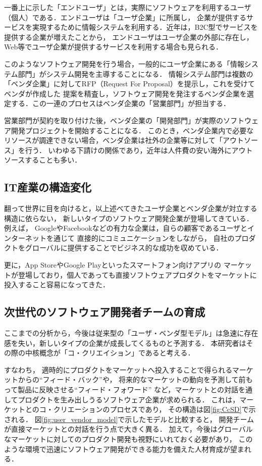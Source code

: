 \documentclass[a4j,9pt,twocolumn,twoside]{jsarticle}
\begin{document}
    一番上に示した「エンドユーザ」とは，実際にソフトウェアを利用するユーザ（個人）である．エンドユーザは「ユーザ企業」に所属し，
    企業が提供するサービスを実現するために情報システムを利用する．近年は，B2C型でサービスを提供する企業が増えたことから，
    エンドユーザはユーザ企業の外部に存在し，Web等でユーザ企業が提供するサービスを利用する場合も見られる．
    
    このようなソフトウェア開発を行う場合，一般的にユーザ企業にある「情報システム部門」がシステム開発を主導することになる．
    情報システム部門は複数の「ベンダ企業」に対してRFP（Request For Proposal）を提示し，これを受けてベンダが作成した
    提案を精査し，ソフトウェア開発を発注するベンダ企業を選定する．この一連のプロセスはベンダ企業の「営業部門」が担当する．
    
    営業部門が契約を取り付けた後，ベンダ企業の「開発部門」が実際のソフトウェア開発プロジェクトを開始することになる．
    このとき，ベンダ企業内で必要なリソースが調達できない場合，ベンダ企業は社外の企業等に対して「アウトソース」を行う．
    いわゆる下請けの関係であり，近年は人件費の安い海外にアウトソースすることも多い．
    
    \subsection{IT産業の構造変化}

    翻って世界に目を向けると，以上述べてきたユーザ企業とベンダ企業が対立する構造に依らない，
    新しいタイプのソフトウェア開発企業が登場してきている．例えば，
    GoogleやFacebookなどの有力な企業は，自らの顧客であるユーザとインターネットを通じて
    直接的にコミュニケーションをしながら，
    自社のプロダクトをグローバルに提供することでビジネス的な成功を収めている．
    
    更に，App StoreやGoogle Playといったスマートフォン向けアプリの
    マーケットが登場しており，個人であっても直接ソフトウェアプロダクトをマーケットに投入すること容易になってきた．
    
	\subsection{次世代のソフトウェア開発者チームの育成}

    ここまでの分析から，今後は従来型の「ユーザ・ベンダ型モデル」は急速に存在感を失い，新しいタイプの企業が成長してくるものと予測する．
    本研究者はその際の中核概念が「コ・クリエイション」であると考える．
    
    すなわち，
    適時的にプロダクトをマーケットへ投入することで得られるマーケットからの``フィード・バック''や，
    将来的なマーケットの動向を予測して前もって製品に反映させる``フィード・フォワード''
    など，マーケットとの対話を通してプロダクトを生み出しうるソフトウェア企業が求められる．
    これは，マーケットとのコ・クリエーションのプロセスであり，
    その構造は図\ref{fig:CcSD}で示される．
    図\ref{fig:user_vendor_model}で示したモデルと比較すると，
    開発チームが直接マーケットとの対話を行う点で大きく異る．
    加えて，今後はグローバルなマーケットに対してのプロダクト開発も視野にいれておく必要があり，
    このような環境で迅速にソフトウェア開発ができる能力を備えた人材育成が望まれる．
    
\end{document}
